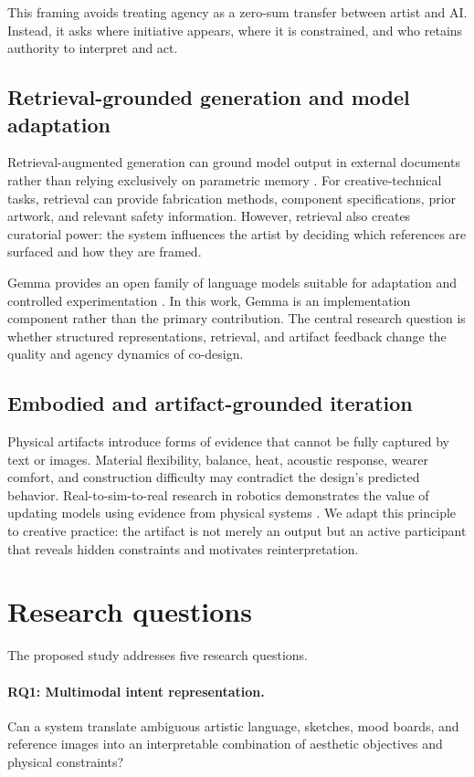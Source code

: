 \documentclass{article}
\begin{document}
This framing avoids treating agency as a zero-sum transfer between artist and
AI. Instead, it asks where initiative appears, where it is constrained, and who
retains authority to interpret and act.

\subsection{Retrieval-grounded generation and model adaptation}

Retrieval-augmented generation can ground model output in external documents
rather than relying exclusively on parametric memory \citep{lewis2020rag}.
For creative-technical tasks, retrieval can provide fabrication methods,
component specifications, prior artwork, and relevant safety information.
However, retrieval also creates curatorial power: the system influences the
artist by deciding which references are surfaced and how they are framed.

Gemma provides an open family of language models suitable for adaptation and
controlled experimentation \citep{gemma2024}. In this work, Gemma is an
implementation component rather than the primary contribution. The central
research question is whether structured representations, retrieval, and
artifact feedback change the quality and agency dynamics of co-design.

\subsection{Embodied and artifact-grounded iteration}

Physical artifacts introduce forms of evidence that cannot be fully captured
by text or images. Material flexibility, balance, heat, acoustic response,
wearer comfort, and construction difficulty may contradict the design's
predicted behavior. Real-to-sim-to-real research in robotics demonstrates the
value of updating models using evidence from physical systems
\citep{torne2024}. We adapt this principle to creative practice: the artifact is
not merely an output but an active participant that reveals hidden constraints
and motivates reinterpretation.

\section{Research questions}

The proposed study addresses five research questions.

\paragraph{RQ1: Multimodal intent representation.}
Can a system translate ambiguous artistic language, sketches, mood boards, and
reference images into an interpretable combination of aesthetic objectives and
physical constraints?
\end{document}
